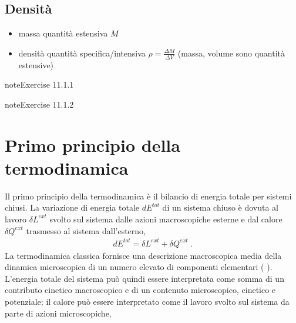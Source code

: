 \documentclass[letterpaper,10pt,italian]{jupyterBook}
\begin{document}
\subsection{Densità}
\label{\detokenize{ch/thermodynamics/principles-lavoisier:densita}}\begin{itemize}
\item {} 
\sphinxAtStartPar
massa quantità estensiva \(M\)

\item {} 
\sphinxAtStartPar
densità quantità specifica/intensiva \(\rho = \frac{\Delta M}{\Delta V}\) (massa, volume sono quantità estensive)

\end{itemize}
 \label{exercise:ch/thermodynamics/principles-lavoisier-exercise-0}

\begin{sphinxadmonition}{note}{Exercise 11.1.1}


\end{sphinxadmonition}
 \label{exercise:ch/thermodynamics/principles-lavoisier-exercise-1}

\begin{sphinxadmonition}{note}{Exercise 11.1.2}


\end{sphinxadmonition}

\sphinxstepscope


\section{Primo principio della termodinamica}
\label{\detokenize{ch/thermodynamics/principles-first:primo-principio-della-termodinamica}}\label{\detokenize{ch/thermodynamics/principles-first:physics-hs-thermodynamics-foundation-principles-first}}\label{\detokenize{ch/thermodynamics/principles-first::doc}}
\sphinxAtStartPar
Il primo principio della termodinamica è il bilancio di energia totale per sistemi chiusi. La variazione di energia totale \(d E^{tot}\) di un sistema chiuso è dovuta al lavoro \(\delta L^{ext}\) svolto sul sistema dalle azioni macroscopiche esterne e dal calore \(\delta Q^{ext}\) trasmesso al sistema dall’esterno,
\begin{equation*}
\begin{split}d E^{tot} = \delta L^{ext} + \delta Q^{ext} \ .\end{split}
\end{equation*}
\sphinxAtStartPar
La termodinamica classica fornisce una descrizione macroscopica media della dinamica microscopica di un numero elevato di componenti elementari ( ). L’energia totale del sistema può quindi essere interpretata come somma di un contributo cinetico macroscopico e di un contenuto microscopico, cinetico e potenziale; il calore può essere interpretato come il lavoro svolto sul sistema da parte di azioni microscopiche,
\end{document}
